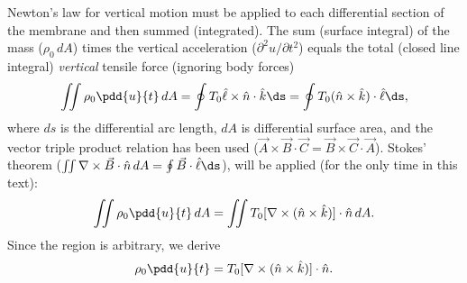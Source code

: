 Newton's law for vertical motion must be applied to each differential section of the membrane and then summed (integrated).  The sum (surface integral) of the mass ($\rho_0\,dA$) times the vertical acceleration ($\partial^2 u/\partial t^2$) equals the total (closed line integral) \emph{vertical} tensile force (ignoring body forces)
\begin{equation}
\iint \rho_0\pdd{u}{t}\,dA = \oint T_0\hat{\ell}\times\hat{n}\cdot\hat{k}\ds = \oint T_0(\hat{n}\times\hat{k})\cdot\hat{\ell}\ds,
\label{eq:4.5.2}
\end{equation}
where $ds$ is the differential arc length, $dA$ is differential surface area, and the vector triple product relation has been used ($\vec{A}\times\vec{B}\cdot\vec{C} = \vec{B}\times\vec{C}\cdot\vec{A}$).  Stokes' theorem ($\iint \nabla\times\vec{B}\cdot\hat{n}\,dA = \oint\vec{B}\cdot\hat{\ell}\ds$), will be applied (for the only time in this text):
\begin{equation}
\iint \rho_0\pdd{u}{t}\,dA = \iint T_0[\nabla\times(\hat{n}\times\hat{k})]\cdot\hat{n}\,dA.
\label{eq:4.5.3}
\end{equation}
Since the region is arbitrary, we derive
\begin{equation}
\rho_0\pdd{u}{t} = T_0[\nabla\times(\hat{n}\times\hat{k})]\cdot\hat{n}.
\label{eq:4.5.4}
\end{equation}

